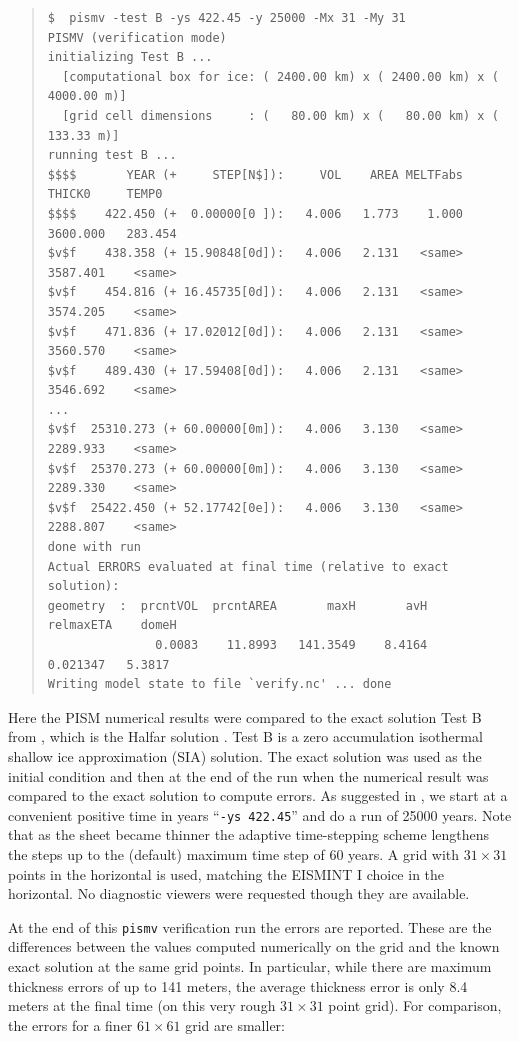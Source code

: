 \documentclass[12pt,final]{amsart}
\renewcommand{\t}[1]{\texttt{#1}}
\begin{document}
\small\begin{quote}\begin{verbatim}
$  pismv -test B -ys 422.45 -y 25000 -Mx 31 -My 31
PISMV (verification mode)
initializing Test B ...
  [computational box for ice: ( 2400.00 km) x ( 2400.00 km) x ( 4000.00 m)]
  [grid cell dimensions     : (   80.00 km) x (   80.00 km) x (  133.33 m)]
running test B ...
$$$$       YEAR (+     STEP[N$]):     VOL    AREA MELTFabs     THICK0     TEMP0
$$$$    422.450 (+  0.00000[0 ]):   4.006   1.773    1.000   3600.000   283.454
$v$f    438.358 (+ 15.90848[0d]):   4.006   2.131   <same>   3587.401    <same>
$v$f    454.816 (+ 16.45735[0d]):   4.006   2.131   <same>   3574.205    <same>
$v$f    471.836 (+ 17.02012[0d]):   4.006   2.131   <same>   3560.570    <same>
$v$f    489.430 (+ 17.59408[0d]):   4.006   2.131   <same>   3546.692    <same>
...
$v$f  25310.273 (+ 60.00000[0m]):   4.006   3.130   <same>   2289.933    <same>
$v$f  25370.273 (+ 60.00000[0m]):   4.006   3.130   <same>   2289.330    <same>
$v$f  25422.450 (+ 52.17742[0e]):   4.006   3.130   <same>   2288.807    <same>
done with run
Actual ERRORS evaluated at final time (relative to exact solution):
geometry  :  prcntVOL  prcntAREA       maxH       avH   relmaxETA    domeH
               0.0083    11.8993   141.3549    8.4164    0.021347   5.3817
Writing model state to file `verify.nc' ... done
\end{verbatim}
\end{quote}\normalsize

Here the PISM numerical results were compared to the exact solution Test B from \cite{BLKCB}, which is the Halfar solution \cite{Halfar83}.  Test B is a zero accumulation isothermal shallow ice approximation (SIA) solution.  The exact solution was used as the initial condition and then at the end of the run when the numerical result was compared to the exact solution to compute errors.  As suggested in \cite{BLKCB}, we start at a convenient positive time in years ``\verb|-ys 422.45|''  and do a run of 25000 years.  Note that as the sheet became thinner the adaptive time-stepping scheme lengthens the steps up to the (default) maximum time step of 60 years.  A grid with $31\times 31$ points in the horizontal is used, matching the EISMINT I choice \cite{EISMINT96} in the horizontal.  No diagnostic viewers were requested though they are available.

At the end of this \t{pismv} verification run the errors are reported.  These are the differences between the values computed numerically on the grid and the known exact solution at the same grid points.  In particular, while there are maximum thickness errors of up to 141 meters, the average thickness error is only 8.4 meters at the final time (on this very rough $31\times 31$ point grid).  For comparison, the errors for a finer $61\times 61$ grid are smaller:
\end{document}

